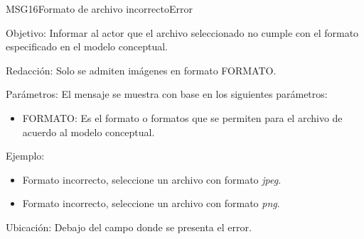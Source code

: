 \begin{mensaje}{MSG16}{Formato de archivo incorrecto}{Error}
	\item [Objetivo:] Informar al actor que el archivo seleccionado no cumple con el formato especificado en el modelo conceptual.
	\item[Redacción:] Solo se admiten imágenes en formato FORMATO.
	\item[Parámetros:] El mensaje se muestra con base en los siguientes parámetros:
	\begin{itemize}
		\item FORMATO: Es el formato o formatos que se permiten para el archivo de acuerdo al modelo conceptual.
	\end{itemize}
	\item[Ejemplo:] \begin{itemize}
		\item Formato incorrecto, seleccione un archivo con formato {\em jpeg}.
		\item Formato incorrecto, seleccione un archivo con formato {\em png}.
	\end{itemize}
	\item [Ubicación:] Debajo del campo donde se presenta el error.
\end{mensaje}